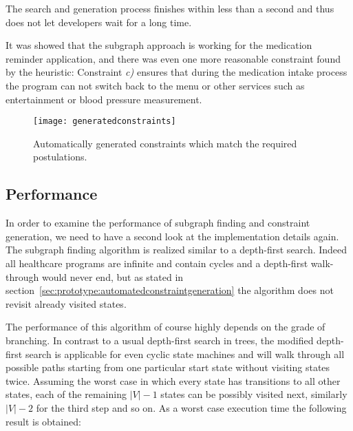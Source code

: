 The search and generation process finishes within less than a second and thus does not let developers wait for a long time.

It was showed that the subgraph approach is working for the medication reminder application, and there was even one more reasonable constraint found by the heuristic: Constraint \emph{c)} ensures that during the medication intake process the program can not switch back to the menu or other services such as entertainment or blood pressure measurement.



\begin{figure}[htbp]
  \centering
  \texttt{[image: generatedconstraints]}
  \caption{Automatically generated constraints which match the required postulations.}
  \label{fig:generatedconstraints}
\end{figure}






\subsection{Performance}
\label{sec:performance}

In order to examine the performance of subgraph finding and constraint generation, we need to have a second look at the implementation details again. The subgraph finding algorithm is realized similar to a depth-first search. Indeed all healthcare programs are infinite and contain cycles and a depth-first walk-through would never end, but as stated in section~\ref{sec:prototype:automatedconstraintgeneration} the algorithm does not revisit already visited states.

The performance of this algorithm of course highly depends on the grade of branching. In contrast to a usual depth-first search in trees, the modified depth-first search is applicable for even cyclic state machines and will walk through all possible paths starting from one particular start state without visiting states twice. Assuming the worst case in which every state has transitions to all other states, each of the remaining $|V|-1$ states can be possibly visited next, similarly $|V|-2$ for the third step and so on. As a worst case execution time the following result is obtained:


